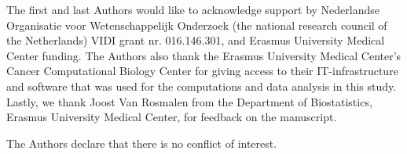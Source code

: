 
\begin{acks}
The first and last Authors would like to acknowledge support by Nederlandse Organisatie voor Wetenschappelijk Onderzoek (the national research council of the Netherlands) VIDI grant nr. 016.146.301, and Erasmus University Medical Center funding. The Authors also thank the Erasmus University Medical Center's Cancer Computational Biology Center for giving access to their IT-infrastructure and software that was used for the computations and data analysis in this study. Lastly, we thank Joost Van Rosmalen from the Department of Biostatistics, Erasmus University Medical Center, for feedback on the manuscript.
\end{acks}

\begin{dci}
The Authors declare that there is no conflict of interest.
\end{dci}